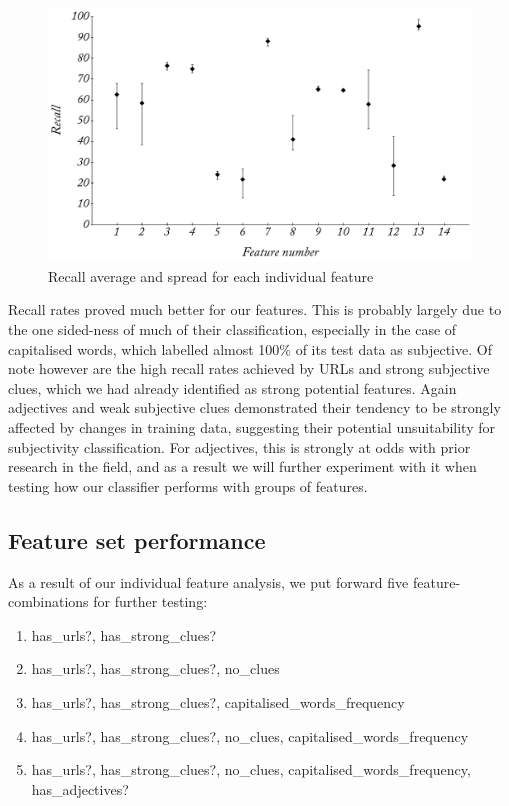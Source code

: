 \begin{figure}
	\caption{Recall average and spread for each individual feature}
	\label{fig:subj_r}
	\centering
		\includegraphics[width=1.0\textwidth]{graphs/subj_r.pdf}
\end{figure}

Recall rates proved much better for our features. This is probably largely due to the one sided-ness of much of their classification, especially in the case of capitalised words, which labelled almost 100\% of its test data as subjective. Of note however are the high recall rates achieved by URLs and strong subjective clues, which we had already identified as strong potential features. Again adjectives and weak subjective clues demonstrated their tendency to be strongly affected by changes in training data, suggesting their potential unsuitability for subjectivity classification. For adjectives, this is strongly at odds with prior research in the field, and as a result we will further experiment with it when testing how our classifier performs with groups of features.

\subsection{Feature set performance}
\label{subjectivity:feature_set}

As a result of our individual feature analysis, we put forward five feature-combinations for further testing:

\begin{enumerate}
	\item has\_urls?, has\_strong\_clues?
	\item has\_urls?, has\_strong\_clues?, no\_clues
	\item has\_urls?, has\_strong\_clues?, capitalised\_words\_frequency
	\item has\_urls?, has\_strong\_clues?, no\_clues, capitalised\_words\_frequency
	\item has\_urls?, has\_strong\_clues?, no\_clues, capitalised\_words\_frequency, has\_adjectives?
\end{enumerate}

